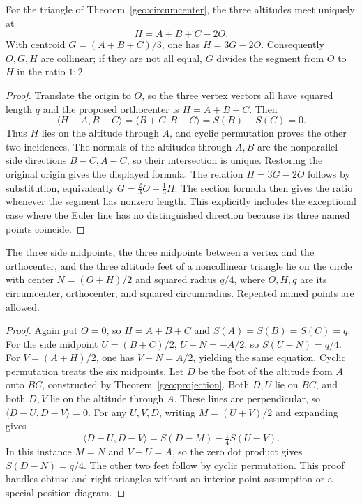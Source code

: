 \begin{theorem}
\label{geo:orthocenter}
For the triangle of Theorem~\ref{geo:circumcenter}, the three altitudes
meet uniquely at
\[
 H=A+B+C-2O.
\]
With centroid $G=(A+B+C)/3$, one has $H=3G-2O$.
Consequently $O,G,H$ are collinear; if they are not all equal, $G$ divides
the segment from $O$ to $H$ in the ratio $1:2$.
\end{theorem}
\begin{proof}
Translate the origin to $O$, so the three vertex vectors all have squared
length $q$ and the proposed orthocenter is $H=A+B+C$.
Then
\[
 \langle H-A,B-C\rangle
 =\langle B+C,B-C\rangle=S(B)-S(C)=0.
\]
Thus $H$ lies on the altitude through $A$, and cyclic permutation proves
the other two incidences. The normals of the altitudes through $A,B$ are
the nonparallel side directions $B-C,A-C$, so their intersection is unique.
Restoring the original origin gives the displayed formula.
The relation $H=3G-2O$ follows by substitution, equivalently
$G=\frac23O+\frac13H$. The section formula then gives the ratio whenever
the segment has nonzero length. This explicitly includes the exceptional
case where the Euler line has no distinguished direction because its three
named points coincide.
\end{proof}

\begin{theorem}
\label{geo:ninepoint}
The three side midpoints, the three midpoints between a vertex and the
orthocenter, and the three altitude feet of a noncollinear triangle lie on
the circle with center $N=(O+H)/2$ and squared radius $q/4$, where $O,H,q$
are its circumcenter, orthocenter, and squared circumradius.
Repeated named points are allowed.
\end{theorem}
\begin{proof}
Again put $O=0$, so $H=A+B+C$ and $S(A)=S(B)=S(C)=q$.
For the side midpoint $U=(B+C)/2$,
$U-N=-A/2$, so $S(U-N)=q/4$.
For $V=(A+H)/2$, one has $V-N=A/2$, yielding the same equation.
Cyclic permutation treats the six midpoints.
Let $D$ be the foot of the altitude from $A$ onto $BC$, constructed by
Theorem~\ref{geo:projection}. Both $D,U$ lie on $BC$, and both $D,V$
lie on the altitude through $A$. These lines are perpendicular, so
$\langle D-U,D-V\rangle=0$. For any $U,V,D$, writing
$M=(U+V)/2$ and expanding gives
\[
 \langle D-U,D-V\rangle=S(D-M)-\tfrac14 S(U-V).
\]
In this instance $M=N$ and $V-U=A$, so the zero dot product gives
$S(D-N)=q/4$. The other two feet follow by cyclic permutation.
This proof handles obtuse and right triangles without an interior-point
assumption or a special position diagram.
\end{proof}

